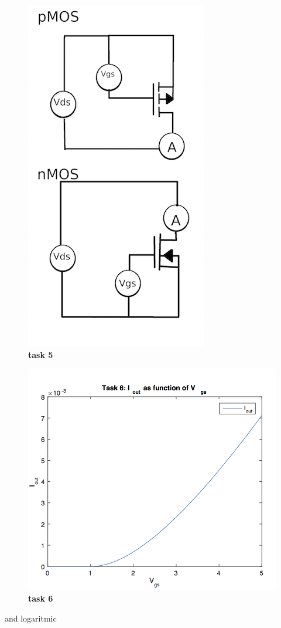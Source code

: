 \documentclass[11pt,a4paper,final]{report}
\begin{document}
\begin{figure}[ht!]
\caption{\textbf{task 5}}
\includegraphics[scale=0.5]{task5.png}
\end{figure}

\begin{figure}[ht!]
\caption{\textbf{task 6}}
\includegraphics[scale=1]{task6.png}
\end{figure}
and logaritmic\\
\end{document}
